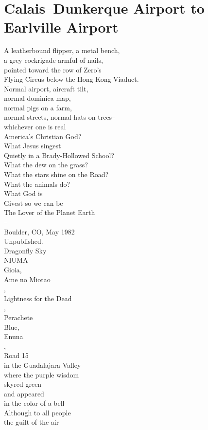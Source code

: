 \documentclass[smalldemyvopaper,11pt,twoside,onecolumn,openright,extrafontsizes]{memoir}
\begin{document}
\chapter{Calais–Dunkerque Airport to Earlville Airport}
A leatherbound flipper, a metal bench,
\\a grey cockrigade armful of nails,
\\pointed toward the row of Zero's
\\Flying Circus below the Hong Kong Viaduct.
\\Normal airport, aircraft tilt,
\\normal dominica map,
\\normal pigs on a farm,
\\normal streets, normal hats on trees--
\\whichever one is real
\\America's Christian God?
\\What Jesus singest
\\Quietly in a Brady-Hollowed School?
\\What the dew on the grass?
\\What the stars shine on the Road?
\\What the animals do?
\\What God is
\\Givest so we can be
\\The Lover of the Planet Earth
\\--
\\Boulder, CO, May 1982
\\Unpublished.
\\Dragonfly Sky
\\NIUMA
\\Gioia,
\\Ame no Miotao
\\,
\\Lightness for the Dead
\\,
\\Perachete
\\Blue,
\\Enuna
\\,
\\Road 15
\\in the Guadalajara Valley
\\where the purple wisdom
\\skyred green
\\and appeared
\\in the color of a bell
\\Although to all people
\\the guilt of the air
\end{document}
